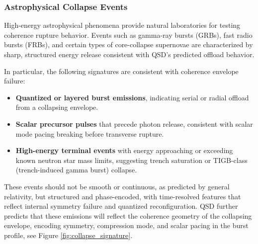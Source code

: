 \documentclass[entropy,article,submit,pdftex,moreauthors]{Definitions/mdpi}
\begin{document}
\subsubsection{Astrophysical Collapse Events}

High-energy astrophysical phenomena provide natural laboratories for testing coherence rupture behavior. Events such as gamma-ray bursts (GRBs), fast radio bursts (FRBs), and certain types of core-collapse supernovae are characterized by sharp, structured energy release consistent with QSD's predicted offload behavior.

In particular, the following signatures are consistent with coherence envelope failure:
\begin{itemize}
  \item \textbf{Quantized or layered burst emissions}, indicating serial or radial offload from a collapsing envelope.
  \item \textbf{Scalar precursor pulses} that precede photon release, consistent with scalar mode pacing breaking before transverse rupture.
  \item \textbf{High-energy terminal events} with energy approaching or exceeding known neutron star mass limits, suggesting trench saturation or TIGB-class (trench-induced gamma burst) collapse.
\end{itemize}

These events should not be smooth or continuous, as predicted by general relativity, but structured and phase-encoded, with time-resolved features that reflect internal symmetry failure and quantized reconfiguration. QSD further predicts that these emissions will reflect the coherence geometry of the collapsing envelope, encoding symmetry, compression mode, and scalar pacing in the burst profile, see Figure \ref{fig:collapse_signature}.
\end{document}
